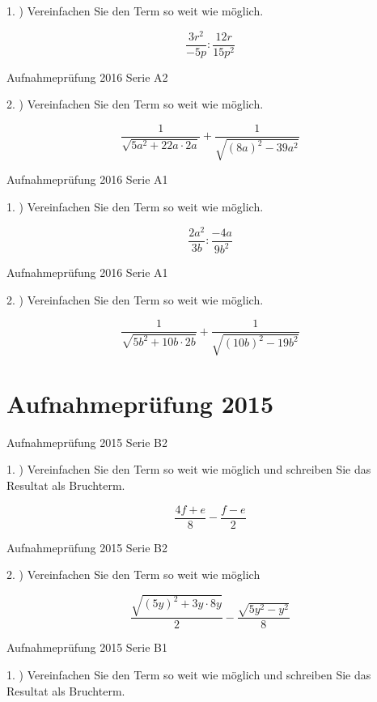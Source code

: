 {1. ) Vereinfachen Sie den Term so weit wie möglich. 

$$\frac{3r^2}{-5p} : \frac{12r}{15p^2}$$


Aufnahmeprüfung 2016 Serie A2

2. ) Vereinfachen Sie den Term so weit wie möglich. 

$$\frac1{\sqrt{5a^2+22a\cdot{}2a}} + \frac1{\sqrt{(8a)^2-39a^2}}$$


Aufnahmeprüfung 2016 Serie A1

1. ) Vereinfachen Sie den Term so weit wie möglich. 

$$\frac{2a^2}{3b} : \frac{-4a}{9b^2}$$


Aufnahmeprüfung 2016 Serie A1

2. ) Vereinfachen Sie den Term so weit wie möglich. 

$$\frac1{\sqrt{5b^2+10b\cdot{}2b}} + \frac1{\sqrt{(10b)^2-19b^2}}$$

\section*{Aufnahmeprüfung 2015}
Aufnahmeprüfung 2015 Serie B2

1. ) Vereinfachen Sie den Term so weit wie möglich und schreiben Sie
das Resultat als Bruchterm.

$$\frac{4f+e}8 - \frac{f-e}2$$

Aufnahmeprüfung 2015 Serie B2

2. ) Vereinfachen Sie den Term so weit wie möglich

$$\frac{\sqrt{(5y)^2+3y\cdot{}8y}}2 - \frac{\sqrt{5y^2-y^2}}8$$

Aufnahmeprüfung 2015 Serie B1

1. ) Vereinfachen Sie den Term so weit wie möglich und schreiben Sie
das Resultat als Bruchterm.

}
